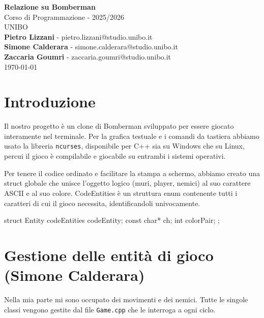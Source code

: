 \documentclass[11pt,a4paper]{article}
\begin{document}
\begin{titlepage}
    \centering
    \vspace*{3cm}
    {\Huge \textbf{Relazione su Bomberman}}\\[1cm]
    {\LARGE Corso di Programmazione - 2025/2026}\\[1cm]
    {\large UNIBO}\\[3cm]
    
    \textbf{Pietro Lizzani} - 
    pietro.lizzani@studio.unibo.it\\[0.5cm]
    
    \textbf{Simone Calderara} - 
    simone.calderara@studio.unibo.it\\[0.5cm]
    
    \textbf{Zaccaria Goumri} - 
    zaccaria.goumri@studio.unibo.it\\[0.5cm]
    
    \vfill
    {\large \today}
\end{titlepage}


\section{Introduzione}
Il nostro progetto \`e un clone di Bomberman sviluppato per essere giocato interamente nel terminale. Per la grafica testuale e i comandi da tastiera abbiamo usato la libreria \texttt{ncurses}, disponibile per C++ sia su Windows che su Linux, percui il gioco è compilabile  e giocabile su entrambi i sistemi operativi. 

Per tenere il codice ordinato e facilitare la stampa a schermo, abbiamo creato una struct globale che unisce l'oggetto logico (muri, player, nemici) al suo carattere ASCII e al suo colore. CodeEntities è un struttura enum contenente tutti i caratteri di cui il gioco necessita, identificandoli univocamente.
\begin{codesnap}
struct Entity{
  codeEntities codeEntity;
  const char* ch;
  int colorPair;
};
\end{codesnap}


\section{Gestione delle entit\`a di gioco (Simone Calderara)}
Nella mia parte mi sono occupato dei movimenti e dei nemici. Tutte le singole classi vengono gestite dal file \texttt{Game.cpp} che le interroga a ogni ciclo.
\end{document}

